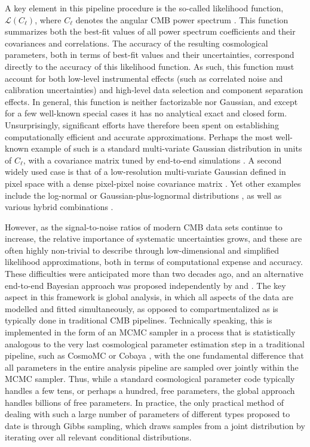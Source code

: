\documentclass[twocolumn]{../common/aa}
\begin{document}
A key element in this pipeline procedure is the so-called likelihood function, $\mathcal{L}(C_{\ell})$, where $C_{\ell}$ denotes the angular CMB power spectrum \citep[e.g.,][]{planck2016-l05}. This function summarizes both the best-fit values of all power spectrum coefficients and their covariances and correlations. The accuracy of the resulting cosmological parameters, both in terms of best-fit values and their uncertainties, correspond directly to the accuracy of this likelihood function. As such, this function must account for both low-level instrumental effects (such as correlated noise and calibration uncertainties) and high-level data selection and component separation effects. In general, this function is neither factorizable nor Gaussian, and except for a few well-known special cases it has no analytical exact and closed form. Unsurprisingly, significant efforts have therefore been spent on establishing computationally efficient and accurate approximations. Perhaps the most well-known example of such is a standard multi-variate Gaussian distribution in units of $C_{\ell}$, with a covariance matrix tuned by end-to-end simulations \citep[e.g.,][]{planck2016-l05}. A second widely used case is that of a low-resolution multi-variate Gaussian defined in pixel space with a dense pixel-pixel noise covariance matrix \citep{hinshaw2012,planck2016-l05}. Yet other examples include the log-normal or Gaussian-plus-lognormal distributions \citep[e.g.,][]{verde2003}, as well as various hybrid combinations \citep[e.g.,][]{gjerlow2013}. 

However, as the signal-to-noise ratios of modern CMB data sets continue to increase, the relative importance of systematic uncertainties grows, and these are often highly non-trivial to describe through low-dimensional and simplified likelihood approximations, both in terms of computational expense and accuracy. These difficulties were anticipated more than two decades ago, and an alternative end-to-end Bayesian approach was proposed independently by \citet{jewell2004} and \citet{wandelt2004}. The key aspect in this framework is global analysis, in which all aspects of the data are modelled and fitted simultaneously, as opposed to compartmentalized as is typically done in traditional CMB pipelines. Technically speaking, this is implemented in the form of an MCMC sampler in a process that is statistically analogous to the very last cosmological parameter estimation step in a traditional pipeline, such as CosmoMC \citep{cosmomc} or Cobaya \citep{Torrado:2020dgo}, with the one fundamental difference that all parameters in the entire analysis pipeline are sampled over jointly within the MCMC sampler. Thus, while a standard cosmological parameter code typically handles a few tens, or perhaps a hundred, free parameters, the global approach handles billions of free parameters. In practice, the only practical method of dealing with such a large number of parameters of different types proposed to date is through Gibbs sampling, which draws samples from a joint distribution by iterating over all relevant conditional distributions.
\end{document}
